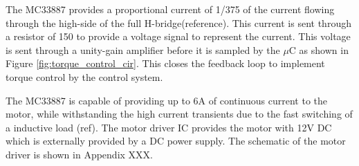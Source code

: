 The MC33887 provides a proportional current of 1/375 of the current flowing through the high-side of the full H-bridge(reference). This current is sent through a resistor of \SI{150}{\Omega} to provide a voltage signal to represent the current. This voltage is sent through a unity-gain amplifier before it is sampled by the $\mu$C as shown in Figure \ref{fig:torque_control_cir}. This closes the feedback loop to implement torque control by the control system.

The MC33887 is capable of providing up to 6A of continuous current to the motor, while withstanding the high current transients due to the fast switching of a inductive load (ref). The motor driver IC provides the motor with 12V DC which is externally provided by a DC power supply. The schematic of the motor driver is shown in Appendix XXX.


